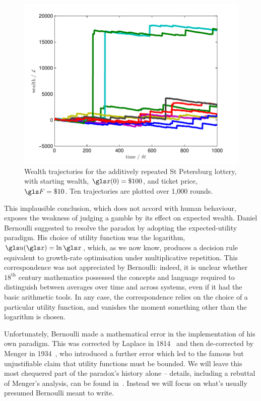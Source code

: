 \begin{figure}
\centering
\includegraphics[width=\textwidth]{./chapter_2/figs/lottery_add_traj.pdf}
\caption{Wealth trajectories for the additively repeated St Petersburg lottery, 
with starting wealth, $\x(0)=\$100$, and ticket price, $\F=\$10$. 
Ten trajectories are plotted over 1,000 rounds.}
\end{figure}

This implausible conclusion, which does not accord with human behaviour, 
exposes the weakness of judging a gamble by its effect on expected 
wealth. Daniel Bernoulli suggested to resolve the paradox by adopting 
the expected-utility paradigm. His choice of utility function was the 
logarithm, $\gu(\x)=\ln \x$, which, as we now know, produces a decision 
rule equivalent to growth-rate optimisation under multiplicative repetition. 
This correspondence was not appreciated by Bernoulli: indeed, it is unclear 
whether $18^\text{th}$ century mathematics possessed the concepts and 
language required to distinguish between averages over time and across 
systems, even if it had the basic arithmetic tools. In any case, the 
correspondence relies on the choice of a particular utility function, 
and vanishes the moment something other than the logarithm is chosen.

Unfortunately, Bernoulli made a mathematical error in the implementation 
of his own paradigm. This was corrected by Laplace in 
1814~\cite{Laplace1814} and then de-corrected by Menger in 
1934~\cite{Menger1934}, who introduced a further error which led to the 
famous but unjustifiable claim that utility functions must be bounded. We 
will leave this most chequered part of the paradox's history alone -- details, 
including a rebuttal of Menger's analysis, can be found 
in~\cite{PetersGell-Mann2016}. Instead we will focus on what's usually 
presumed Bernoulli meant to write.

